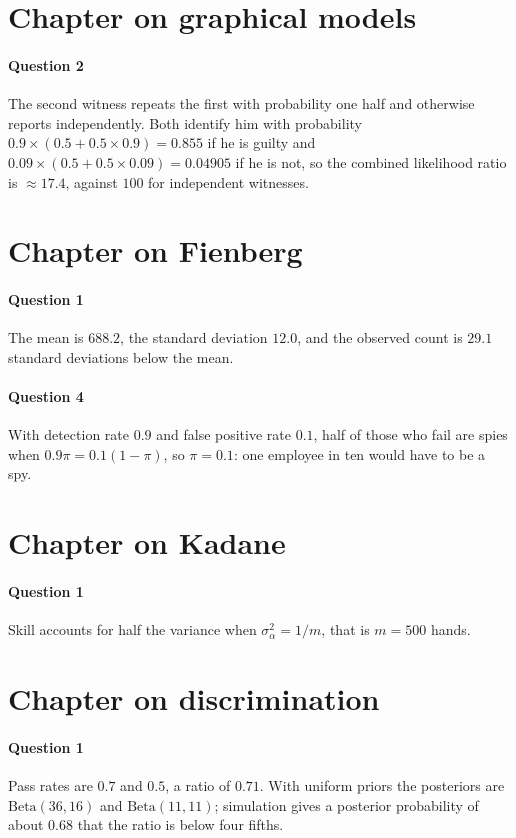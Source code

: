 \section*{Chapter on graphical models}
\paragraph{Question 2} The second witness repeats the first with probability one half and otherwise reports independently. Both identify him with probability $0.9\times(0.5 + 0.5\times 0.9) = 0.855$ if he is guilty and $0.09\times(0.5 + 0.5\times 0.09) = 0.04905$ if he is not, so the combined likelihood ratio is $\approx 17.4$, against $100$ for independent witnesses.

\section*{Chapter on Fienberg}
\paragraph{Question 1} The mean is $688.2$, the standard deviation $12.0$, and the observed count is $29.1$ standard deviations below the mean.
\paragraph{Question 4} With detection rate $0.9$ and false positive rate $0.1$, half of those who fail are spies when $0.9\pi = 0.1(1-\pi)$, so $\pi = 0.1$: one employee in ten would have to be a spy.

\section*{Chapter on Kadane}
\paragraph{Question 1} Skill accounts for half the variance when $\sigma_\alpha^2 = 1/m$, that is $m = 500$ hands.

\section*{Chapter on discrimination}
\paragraph{Question 1} Pass rates are $0.7$ and $0.5$, a ratio of $0.71$. With uniform priors the posteriors are $\text{Beta}(36,16)$ and $\text{Beta}(11,11)$; simulation gives a posterior probability of about $0.68$ that the ratio is below four fifths.
